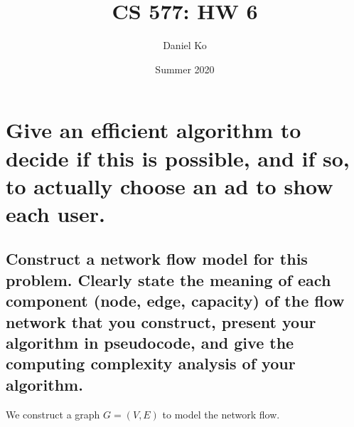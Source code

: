 \documentclass[11pt]{scrartcl}
\title{CS 577: HW 6}
\author{Daniel Ko}
\date{Summer 2020}
\begin{document}
\maketitle

\section{
  Give an efficient algorithm to decide if this is possible, and if so, to actually choose an ad
  to show each user.
 }

\subsection{
	Construct a network flow model for this problem. Clearly state the
	meaning of each component (node, edge, capacity) of the flow network that you
	construct, present your algorithm in pseudocode, and give the computing complexity
	analysis of your algorithm.
}
We construct a graph $G=(V,E)$ to model the network flow.
\end{document}
